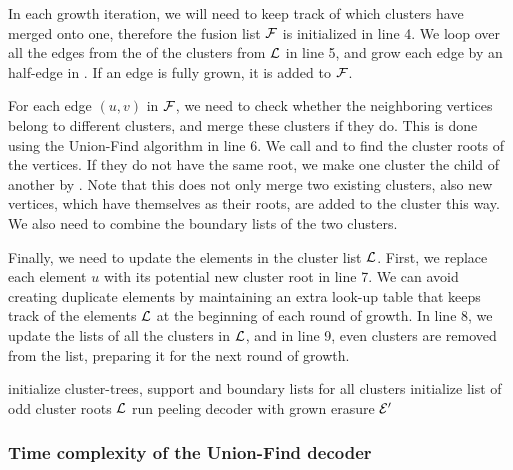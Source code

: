 In each growth iteration, we will need to keep track of which clusters have merged onto one, therefore the fusion list $\mathcal{F}$ is initialized in line 4. We loop over all the edges from the  of the clusters from $\mathcal{L}$ in line 5, and grow each edge by an half-edge in . If an edge is fully grown, it is added to $\mathcal{F}$.

For each edge $(u,v)$ in $\mathcal{F}$, we need to check whether the neighboring vertices belong to different clusters, and merge these clusters if they do. This is done using the Union-Find algorithm in line 6. We call  and  to find the cluster roots of the vertices. If they do not have the same root, we make one cluster the child of another by . Note that this does not only merge two existing clusters, also new vertices, which have themselves as their roots, are added to the cluster this way. We also need to combine the boundary lists of the two clusters.

Finally, we need to update the elements in the cluster list $\mathcal{L}$. First, we replace each element $u$ with its potential new cluster root  in line 7. We can avoid creating duplicate elements by maintaining an extra look-up table that keeps track of the elements $\mathcal{L}$ at the beginning of each round of growth. In line 8, we update the  lists of all the clusters in $\mathcal{L}$, and in line 9, even clusters are removed from the list, preparing it for the next round of growth.

\begin{algo}[algotitle=Union-Find decoder \cite{delfosse2017almost}, label=algo:uf]
  \begin{algorithm}[H]
    \BlankLine
    initialize cluster-trees, support and boundary lists for all clusters \;
    initialize list of odd cluster roots $\mathcal{L}$\;
    run peeling decoder with grown erasure $\mathcal{E}'$
  \end{algorithm}
\end{algo}

\subsubsection{Time complexity of the Union-Find decoder}
